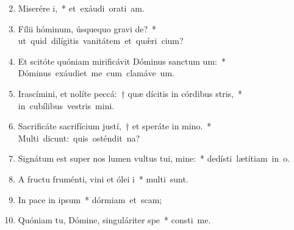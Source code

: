 \begin{flushleft}
\begin{enumerate}[leftmargin=*]
\setcounter{enumi}{1}

\item Miserére i,~* \mbox{et exáudi orati am.}
\item Fílii hóminum, úsquequo gravi de?~* \mbox{ut quid dilígitis vanitátem et qu\'{\ae}ri cium?}
\item Et scitóte quóniam mirificávit Dóminus sanctum um:~* \mbox{Dóminus exáudiet me cum clamáve  um.}
\item Irascímini, et nolíte peccá:~† quæ dícitis in córdibus stris,~* \mbox{in cubílibus vestris mini.}
\item Sacrificáte sacrifícium justí,~† et speráte in mino.~* \mbox{Multi dicunt: quis osténdit  na?}
\item Signátum est super nos lumen vultus tui, mine:~* \mbox{dedísti lætítiam in  o.}
\item A fructu fruménti, vini et ólei i~* \mbox{multi sunt.}
\item In pace in ipsum~* \mbox{dórmiam et scam;}
\item Quóniam tu, Dómine, singuláriter  spe~* \mbox{consti me.}

\end{enumerate}
\end{flushleft}

